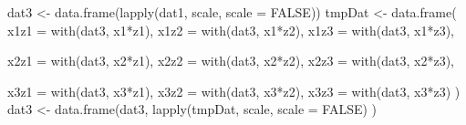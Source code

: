 \begin{Schunk}
\begin{Sinput}
 dat3 <- data.frame(lapply(dat1, scale, scale = FALSE)) 
 tmpDat <- data.frame(
     x1z1 = with(dat3, x1*z1),
     x1z2 = with(dat3, x1*z2),
     x1z3 = with(dat3, x1*z3),
     
     x2z1 = with(dat3, x2*z1),
     x2z2 = with(dat3, x2*z2),
     x2z3 = with(dat3, x2*z3),
     
     x3z1 = with(dat3, x3*z1),
     x3z2 = with(dat3, x3*z2),
     x3z3 = with(dat3, x3*z3)
 )
 dat3 <- data.frame(dat3,
                    lapply(tmpDat, scale, scale = FALSE)
                    )
\end{Sinput}
\end{Schunk}
